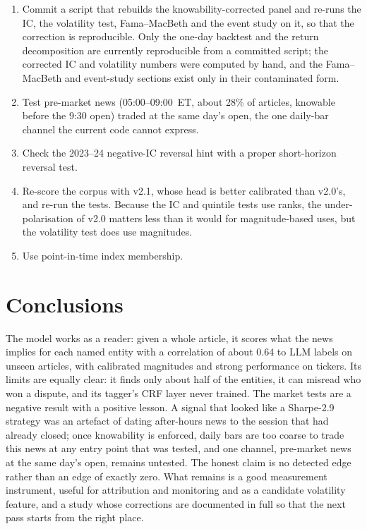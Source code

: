 \documentclass[11pt,letterpaper]{article}
\begin{document}
\begin{enumerate}
  \item Commit a script that rebuilds the knowability-corrected panel and re-runs the IC, the
        volatility test, Fama--MacBeth and the event study on it, so that the correction is
        reproducible. Only the one-day backtest and the return decomposition are currently
        reproducible from a committed script; the corrected IC and volatility numbers were
        computed by hand, and the Fama--MacBeth and event-study sections exist only in their
        contaminated form.
  \item Test pre-market news (05:00--09:00~ET, about 28\% of articles, knowable before the 9:30
        open) traded at the same day's open, the one daily-bar channel the current code cannot
        express.
  \item Check the 2023--24 negative-IC reversal hint with a proper short-horizon reversal test.
  \item Re-score the corpus with v2.1, whose head is better calibrated than v2.0's, and re-run
        the tests. Because the IC and quintile tests use ranks, the under-polarisation of v2.0
        matters less than it would for magnitude-based uses, but the volatility test does use
        magnitudes.
  \item Use point-in-time index membership.
\end{enumerate}

\section{Conclusions}
\label{sec:conclusions}

The model works as a reader: given a whole article, it scores what the news implies for each
named entity with a correlation of about 0.64 to LLM labels on unseen articles, with calibrated
magnitudes and strong performance on tickers. Its limits are equally clear: it finds only about
half of the entities, it can misread who won a dispute, and its tagger's CRF layer never trained.
The market tests are a negative result with a positive lesson. A signal that looked like a
Sharpe-2.9 strategy was an artefact of dating after-hours news to the session that had already
closed; once knowability is enforced, daily bars are too coarse to trade this news at any entry
point that was tested, and one channel, pre-market news at the same day's open, remains untested.
The honest claim is no detected edge rather than an edge of exactly zero. What remains is a good
measurement instrument, useful for attribution and monitoring and as a candidate volatility
feature, and a study whose corrections are documented in full so that the next pass starts from
the right place.
\end{document}
